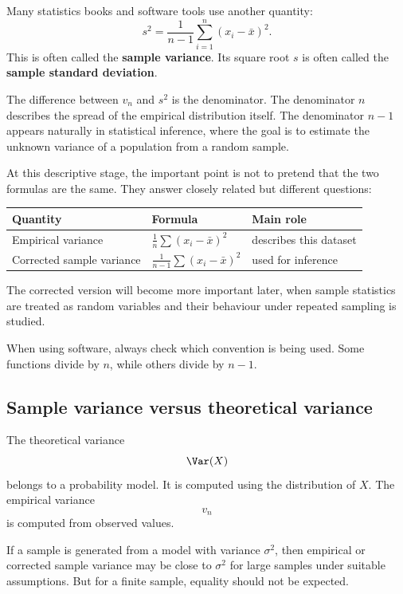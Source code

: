 Many statistics books and software tools use another quantity:
\[
s^2=\frac1{n-1}\sum_{i=1}^n (x_i-\bar{x})^2.
\]
This is often called the \textbf{sample variance}. Its square root \(s\) is often
called the \textbf{sample standard deviation}.

The difference between \(v_n\) and \(s^2\) is the denominator. The denominator
\(n\) describes the spread of the empirical distribution itself. The denominator
\(n-1\) appears naturally in statistical inference, where the goal is to estimate
the unknown variance of a population from a random sample.

At this descriptive stage, the important point is not to pretend that the two
formulas are the same. They answer closely related but different questions:
\begin{center}
\begin{tabular}{lll}
\toprule
Quantity & Formula & Main role \\
\midrule
Empirical variance & \(\frac1n\sum (x_i-\bar{x})^2\) & describes this dataset \\
Corrected sample variance & \(\frac1{n-1}\sum (x_i-\bar{x})^2\) & used for inference \\
\bottomrule
\end{tabular}
\end{center}

The corrected version will become more important later, when sample statistics
are treated as random variables and their behaviour under repeated sampling is
studied.

\begin{remarkbox}
When using software, always check which convention is being used. Some functions
divide by \(n\), while others divide by \(n-1\).
\end{remarkbox}

\subsection*{Sample variance versus theoretical variance}

The theoretical variance
\[
\Var(X)
\]
belongs to a probability model. It is computed using the distribution of \(X\).
The empirical variance
\[
v_n
\]
is computed from observed values.

If a sample is generated from a model with variance \(\sigma^2\), then empirical
or corrected sample variance may be close to \(\sigma^2\) for large samples under
suitable assumptions. But for a finite sample, equality should not be expected.

